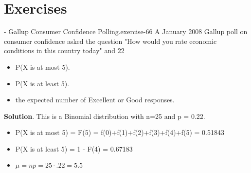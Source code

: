 \documentclass[10pt,]{book}
\numberwithin{equation}{section}
\begin{document}
\section[{Exercises}]{Exercises}\label{section-50}
\hypertarget{p-1013}{}%
\begin{inlineexercise}{- Gallup Consumer Confidence Polling.}{exercise-66}%
\hypertarget{p-1014}{}%
A January 2008 Gallup poll on consumer confidence asked the question "How would you rate economic conditions in this country today" and 22%
\begin{itemize}[label=\textbullet]
\item{}P(X is at most 5).%
\item{}P(X is at least 5).%
\item{}the expected number of Excellent or Good responses.%
\end{itemize}
%
\textbf{Solution}.\quad%
\hypertarget{p-1015}{}%
This is a Binomial distribution with n=25 and p = 0.22. \leavevmode%
\begin{itemize}[label=\textbullet]
\item{}P(X is at most 5) = F(5) = f(0)+f(1)+f(2)+f(3)+f(4)+f(5) = 0.51843%
\item{}P(X is at least 5) = 1 - F(4) = 0.67183%
\item{}\(\mu = np = 25 \cdot .22 = 5.5\)%
\end{itemize}
%
\end{inlineexercise}
%
\par
\hypertarget{p-1016}{}%
\end{document}
